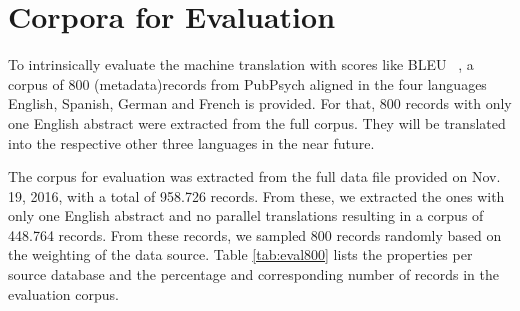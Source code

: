 \documentclass[a4paper,11pt]{article}
\begin{document}
%  


\section{Corpora for Evaluation}
\label{s:evaluation}
To intrinsically evaluate the machine translation with scores like BLEU ~\cite{papineni_bleu:_2002}, a corpus of 800 (metadata)records from PubPsych aligned in the four languages English, Spanish, German and French is provided. For that, 800 records with only one English abstract were extracted from the full corpus. They will be translated into the respective other three languages in the near future.

The corpus for evaluation was extracted from the full data file provided on Nov. 19, 2016, with a total of 958.726 records. From these, we extracted the ones with only one English abstract and no parallel translations resulting in a corpus of 448.764 records. From these records, we sampled 800 records randomly based on the weighting of the data source. Table \ref{tab:eval800} lists the properties per source database and the percentage and corresponding number of records in the evaluation corpus.
\end{document}
